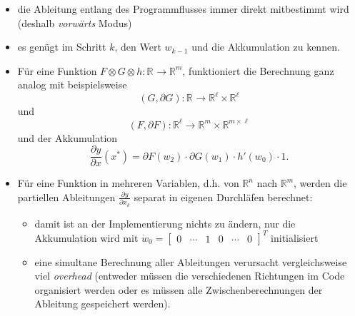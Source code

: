 \documentclass[
]{book}
\providecommand{\tightlist}{%
  \setlength{\itemsep}{0pt}\setlength{\parskip}{0pt}}
\theoremstyle{definition}
\theoremstyle{definition}
\theoremstyle{definition}
\theoremstyle{definition}
\theoremstyle{remark}
\begin{document}
\begin{itemize}
\tightlist
\item
  die Ableitung entlang des Programmflusses immer direkt mitbestimmt wird
  (deshalb \emph{vorwärts} Modus)
\item
  es genügt im Schritt \(k\), den Wert \(w_{k-1}\) und die Akkumulation zu
  kennen.
\item
  Für eine Funktion \(F\otimes G \otimes h \colon \mathbb R^{}\to \mathbb R^{m}\), funktioniert die Berechnung ganz analog mit beispielsweise
  \begin{equation*}
  (G, \partial G) \colon \mathbb R^{} \to \mathbb R^{\ell} \times  \mathbb R^{\ell}
  \end{equation*}
  und
  \begin{equation*}
  (F, \partial F) \colon \mathbb R^{\ell} \to \mathbb R^{m} \times  \mathbb
  R^{m \times \ell}
  \end{equation*}
  und der Akkumulation
  \begin{equation*}
  \frac{\partial y}{\partial x}(x^*) = \partial F(w_2)\cdot \partial G(w_1)\cdot h'(w_0) \cdot 1.
  \end{equation*}
\item
  Für eine Funktion in mehreren Variablen, d.h. von \(\mathbb R^{n}\) nach \(\mathbb R^{m}\), werden die
  partiellen Ableitungen \(\frac{\partial y}{\partial x_k}\) separat in eigenen Durchläfen berechnet:

  \begin{itemize}
  \tightlist
  \item
    damit ist an der Implementierung nichts zu ändern, nur die
    Akkumulation wird mit \(\dot w_0 = \begin{bmatrix} 0 & \dotsm & 1 & 0 & \dotsm & 0 \end{bmatrix}^T\) initialisiert
  \item
    eine simultane Berechnung aller Ableitungen verursacht vergleichsweise
    viel \emph{overhead} (entweder müssen die verschiedenen Richtungen im
    Code
    organisiert werden oder es müssen alle Zwischenberechnungen der
    Ableitung gespeichert werden).
  \end{itemize}
\end{itemize}
\end{document}
